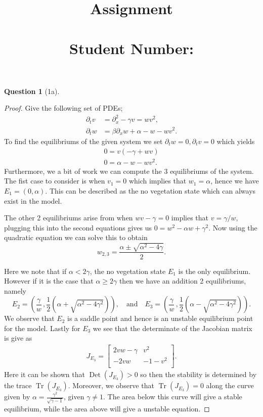 \documentclass[11pt]{article}
\author{}
\title{\vspace{-50pt}
    \Huge \subject \\ Assignment \hw
\\ \vspace{20pt} \large \name \\ Student Number:\SID}
\date{}
\theoremstyle{quest}
\newtheorem*{question}{Question}
\newcommand{\Dp}{\partial}
\DeclareMathOperator{\Tr}{Tr}
\DeclareMathOperator{\Det}{Det}
\begin{document}
\maketitle{}




\begin{question}[1a]
\end{question}
\begin{proof}
    Give the following set of PDEs;
    \begin{align*}
        \Dp_t v &= \Dp_{x}^{2} - \gamma v = wv^2, \\
        \Dp_t w &= \beta \Dp_x w +\alpha -w -wv^2.
    \end{align*}
    To find the equilibriums of the given system we set $ \Dp_t w = 0, \Dp_t v = 0$ which yields
    \begin{align*}
        0= v \left( -\gamma + w v \right)\\
        0= \alpha -w -wv^2.
    \end{align*}
    Furthermore, we a bit of work we can compute the 3 equilibriums of the system.
    The fist case to consider is when $v_1 =0$ which implies that $w_1 =\alpha$, hence we have
    $E_1 = \left( 0, \alpha  \right)$. This can be described as the no vegetation state which
    can always exist in the model.

    The other 2 equilibriums arise from when $ wv-\gamma =0$ implies that $v=\gamma / w$, plugging this
    into the second equations gives us $0=w^2 - \alpha w + \gamma^2$. Now using the quadratic equation
    we can solve this to obtain $$ w_{2,3} = \frac{\alpha \pm \sqrt{ \alpha^2 - 4 \gamma }}{2}.$$

    Here we note that if $\alpha < 2 \gamma$, the no vegetation state $E_1$ is the only equilibrium.
    However if it is the case that $ \alpha \geq 2 \gamma$ then we have an addition 2 equilibriums, namely
    $$ E_2 = \left( \frac{\gamma }{w} \, , \frac{1}{2}\left(\alpha + \sqrt{\alpha^2 -4\gamma^2} \right)  \right),
    \quad \text{and} \quad E_3 = \left( \frac{\gamma }{w}\, , \frac{1}{2} \left(\alpha -\sqrt{\alpha^2 -4\gamma^2} \right)  \right). $$
    We observe that $E_2$ is a saddle point and hence is an unstable equilibrium point for the model.
    Lastly for $E_3$ we see that the determinate of the Jacobian matrix is give as
    \begin{align*}
        J_{E_3} = 
        \begin{bmatrix}
            2vw - \gamma & v^2 \\
            -2vw & -1 -v^2 \\
        \end{bmatrix}
        .
    \end{align*}
    Here it can be shown that $\Det(J_{E_3}) > 0$ so then the stability is determined by the trace $\Tr(J_{E_3})$.
    Moreover, we observe that $\Tr(J_{E_3}) = 0$ along the curve given by $\alpha = \frac{\gamma^2}{\sqrt{\gamma-1}}$, given
    $\gamma \neq 1$. The area below this curve will give a stable equilibrium, while the area above will give a unstable
    equation.


\end{proof}
\end{document}
